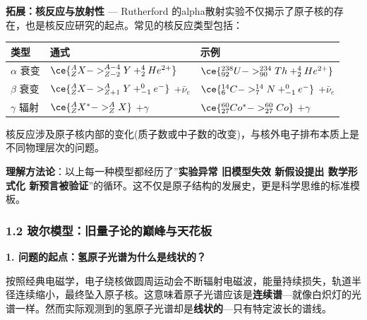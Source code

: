 \textbf{拓展：核反应与放射性} --- Rutherford 的alpha散射实验不仅揭示了原子核的存在，也是核反应研究的起点。常见的核反应类型包括：

{\def\LTcaptype{none} %
\begin{longtable}[]{@{}
  >{\raggedright\arraybackslash}p{}
  >{\raggedright\arraybackslash}p{}
  >{\raggedright\arraybackslash}p{}@{}}
\toprule\noalign{}
\begin{minipage}[b]{\linewidth}\raggedright
类型
\end{minipage} & \begin{minipage}[b]{\linewidth}\raggedright
通式
\end{minipage} & \begin{minipage}[b]{\linewidth}\raggedright
示例
\end{minipage} \\
\midrule\noalign{}
\endhead
\bottomrule\noalign{}
\endlastfoot
\(\alpha\) 衰变 & \(\ce{^{A}_{Z}X -> ^{A-4}_{Z-2}Y + ^{4}_{2}He^{2+}}\) & \(\ce{^{238}_{92}U -> ^{234}_{90}Th + ^{4}_{2}He^{2+}}\) \\
\(\beta\) 衰变 & \(\ce{^{A}_{Z}X -> ^{A}_{Z+1}Y + ^{0}_{-1}e^{-}}\) \(+ \bar{\nu}_e\) & \(\ce{^{14}_{6}C -> ^{14}_{7}N + ^{0}_{-1}e^{-}}\) \(+ \bar{\nu}_e\) \\
\(\gamma\) 辐射 & \(\ce{^{A}_{Z}X^{*} -> ^{A}_{Z}X}\) \(+ \gamma\) & \(\ce{^{60}_{27}Co^{*} -> ^{60}_{27}Co}\) \(+ \gamma\) \\
\end{longtable}
}

核反应涉及原子核内部的变化(质子数或中子数的改变)，与核外电子排布本质上是不同物理层次的问题。

\textbf{理解方法论}：以上每一种模型都经历了''\textbf{实验异常 \箭 旧模型失效 \箭 新假设提出 \箭 数学形式化 \箭 新预言被验证}''的循环。这不仅是原子结构的发展史，更是科学思维的标准模板。

\subsubsection{1.2 玻尔模型：旧量子论的巅峰与天花板}\label{ux73bbux5c14ux6a21ux578bux65e7ux91cfux5b50ux8bbaux7684ux5dc5ux5cf0ux4e0eux5929ux82b1ux677f}

\textbf{1. 问题的起点：氢原子光谱为什么是线状的？}

按照经典电磁学，电子绕核做圆周运动会不断辐射电磁波，能量持续损失，轨道半径连续缩小，最终坠入原子核。这意味着原子光谱应该是\textbf{连续谱}---就像白炽灯的光谱一样。然而实际观测到的氢原子光谱却是\textbf{线状的}---只有特定波长的谱线。

